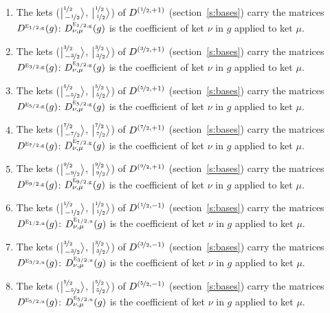\documentclass[10pt,a4paper]{article}
\numberwithin{equation}{section}
\newcommand{\irr}[1]{\text{\normalfont\scshape #1}}
\newcommand{\ptag}[1]{\mathrm{#1}}
\newcommand{\irrJp}[2]{D^{(#1,#2)}}
\newcommand{\repD}[1]{D^{#1}}
\newcommand{\intx}{\mu}
\newcommand{\jm}[2]{\bigl\lvert{}^{#1}_{\,#2}\bigr\rangle}
\newenvironment{romanlist}{\begin{enumerate}%
\renewcommand{\labelenumi}{(\roman{enumi})}}%
  {\end{enumerate}}
\begin{document}
\begin{romanlist}\raggedright
\item The kets ($\jm{\nicefrac{1}{2}}{-\nicefrac{1}{2}}$, $\jm{\nicefrac{1}{2}}{\nicefrac{1}{2}}$) of $\irrJp{\nicefrac{1}{2}}{+1}$ (section~\ref{s:bases}) carry the matrices $\repD{\irr{e}_{1/2,\ptag{g}}}(g)$: $\repD{\irr{e}_{1/2,\ptag{g}}}_{\nu,\intx}(g)$ is the coefficient of ket $\nu$ in $g$ applied to ket $\intx$.
\item The kets ($\jm{\nicefrac{3}{2}}{-\nicefrac{3}{2}}$, $\jm{\nicefrac{3}{2}}{\nicefrac{3}{2}}$) of $\irrJp{\nicefrac{3}{2}}{+1}$ (section~\ref{s:bases}) carry the matrices $\repD{\irr{e}_{3/2,\ptag{g}}}(g)$: $\repD{\irr{e}_{3/2,\ptag{g}}}_{\nu,\intx}(g)$ is the coefficient of ket $\nu$ in $g$ applied to ket $\intx$.
\item The kets ($\jm{\nicefrac{5}{2}}{-\nicefrac{5}{2}}$, $\jm{\nicefrac{5}{2}}{\nicefrac{5}{2}}$) of $\irrJp{\nicefrac{5}{2}}{+1}$ (section~\ref{s:bases}) carry the matrices $\repD{\irr{e}_{5/2,\ptag{g}}}(g)$: $\repD{\irr{e}_{5/2,\ptag{g}}}_{\nu,\intx}(g)$ is the coefficient of ket $\nu$ in $g$ applied to ket $\intx$.
\item The kets ($\jm{\nicefrac{7}{2}}{-\nicefrac{7}{2}}$, $\jm{\nicefrac{7}{2}}{\nicefrac{7}{2}}$) of $\irrJp{\nicefrac{7}{2}}{+1}$ (section~\ref{s:bases}) carry the matrices $\repD{\irr{e}_{7/2,\ptag{g}}}(g)$: $\repD{\irr{e}_{7/2,\ptag{g}}}_{\nu,\intx}(g)$ is the coefficient of ket $\nu$ in $g$ applied to ket $\intx$.
\item The kets ($\jm{\nicefrac{9}{2}}{-\nicefrac{9}{2}}$, $\jm{\nicefrac{9}{2}}{\nicefrac{9}{2}}$) of $\irrJp{\nicefrac{9}{2}}{+1}$ (section~\ref{s:bases}) carry the matrices $\repD{\irr{e}_{9/2,\ptag{g}}}(g)$: $\repD{\irr{e}_{9/2,\ptag{g}}}_{\nu,\intx}(g)$ is the coefficient of ket $\nu$ in $g$ applied to ket $\intx$.
\item The kets ($\jm{\nicefrac{1}{2}}{-\nicefrac{1}{2}}$, $\jm{\nicefrac{1}{2}}{\nicefrac{1}{2}}$) of $\irrJp{\nicefrac{1}{2}}{-1}$ (section~\ref{s:bases}) carry the matrices $\repD{\irr{e}_{1/2,\ptag{u}}}(g)$: $\repD{\irr{e}_{1/2,\ptag{u}}}_{\nu,\intx}(g)$ is the coefficient of ket $\nu$ in $g$ applied to ket $\intx$.
\item The kets ($\jm{\nicefrac{3}{2}}{-\nicefrac{3}{2}}$, $\jm{\nicefrac{3}{2}}{\nicefrac{3}{2}}$) of $\irrJp{\nicefrac{3}{2}}{-1}$ (section~\ref{s:bases}) carry the matrices $\repD{\irr{e}_{3/2,\ptag{u}}}(g)$: $\repD{\irr{e}_{3/2,\ptag{u}}}_{\nu,\intx}(g)$ is the coefficient of ket $\nu$ in $g$ applied to ket $\intx$.
\item The kets ($\jm{\nicefrac{5}{2}}{-\nicefrac{5}{2}}$, $\jm{\nicefrac{5}{2}}{\nicefrac{5}{2}}$) of $\irrJp{\nicefrac{5}{2}}{-1}$ (section~\ref{s:bases}) carry the matrices $\repD{\irr{e}_{5/2,\ptag{u}}}(g)$: $\repD{\irr{e}_{5/2,\ptag{u}}}_{\nu,\intx}(g)$ is the coefficient of ket $\nu$ in $g$ applied to ket $\intx$.

\end{romanlist}
\end{document}
